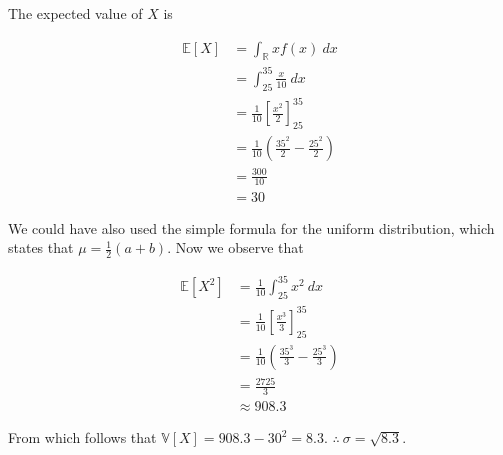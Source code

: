 \documentclass[a4paper, 12pt]{article}
\begin{document}
The expected value of $X$ is 

\begin{align*}
    \mathbb{E}\left[ X \right] &= \int_{\mathbb{R}} x f(x) ~ dx \\ 
                               &= \int_{25}^{35} \frac{x}{10} ~ dx \\ 
                               &= \frac{1}{10} \left[ \frac{x^2}{2} \right]_{25}^{35}  \\ 
                               &=\frac{1}{10}\left( \frac{35^2}{2} - \frac{25^2}{2} \right)  \\ 
                               &= \frac{300}{10} \\ 
                               &= 30
\end{align*}

We could have also used the simple formula for the uniform distribution, which
states that $\mu = \frac{1}{2}(a+b)$. Now we observe that 

\begin{align*}
    \mathbb{E}\left[ X^2 \right] &= \frac{1}{10} \int_{25}^{35}x^2 ~ dx \\ 
                               &= \frac{1}{10} \left[ \frac{x^3}{3} \right]_{25}^{35}  \\ 
                               &=\frac{1}{10}\left( \frac{35^3}{3} - \frac{25^3}{3} \right)  \\ 
                               &= \frac{2725}{3} \\ 
                               &\approx 908.3
\end{align*}

From which follows that $\mathbb{V}\left[ X \right] = 908.3 - 30^2 = 8.3$. $\therefore ~ \sigma = \sqrt{8.3} $.
\end{document}
